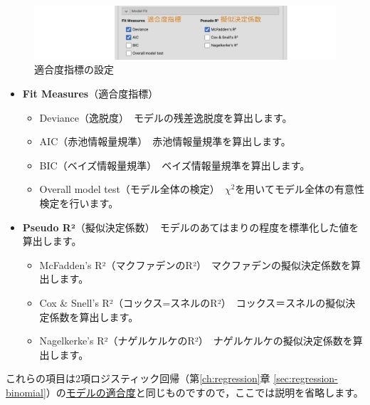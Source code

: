 \documentclass[
  12pt,
  a5jpaper,
  lualatex, ja=standard]{bxjsbook}
\providecommand{\tightlist}{%
  \setlength{\itemsep}{0pt}\setlength{\parskip}{0pt}}
\newenvironment{jmvsettings}{%
	\begin{center}%
	\begin{tcolorbox}[%
		title=設定項目,
		colframe=gmoji,
		colbacktitle=gmoji,
		colback=gmoji!2!white,
		breakable,
		width=.9\textwidth,
		]\small\addtolength{\leftmargini}{-3\labelsep}%
	}%
	{\end{tcolorbox}\end{center}}
\begin{document}
\begin{figure}[!ht]

{\centering \includegraphics[width=1\linewidth]{images/regression/binomial-model-fit} 

}

\caption{適合度指標の設定}\label{fig:frequencies-loglin-model-fit}
\end{figure}

\begin{jmvsettings}

\begin{itemize}
\tightlist
\item
  \textbf{Fit Measures}（適合度指標）

  \begin{itemize}
  \tightlist
  \item
    Deviance（逸脱度）　モデルの残差逸脱度を算出します。
  \item
    AIC（赤池情報量規準）　赤池情報量規準を算出します。
  \item
    BIC（ベイズ情報量規準）　ベイズ情報量規準を算出します。
  \item
    Overall model test（モデル全体の検定）　\(\chi^{2}\)を用いてモデル全体の有意性検定を行います。
  \end{itemize}
\item
  \textbf{Pseudo R²}（擬似決定係数）　モデルのあてはまりの程度を標準化した値を算出します。

  \begin{itemize}
  \tightlist
  \item
    McFadden's R²（マクファデンのR²）　マクファデンの擬似決定係数を算出します。
  \item
    Cox \& Snell's R²（コックス=スネルのR²）　コックス＝スネルの擬似決定係数を算出します。
  \item
    Nagelkerke's R²（ナゲルケルケのR²）　ナゲルケルケの擬似決定係数を算出します。
  \end{itemize}
\end{itemize}

\end{jmvsettings}

これらの項目は2項ロジスティック回帰（第\ref{ch:regression}章 \ref{sec:regression-binomial}）の\protect\hyperlink{sub:regression-binomial-model-fit}{モデルの適合度}と同じものですので，ここでは説明を省略します。
\end{document}
